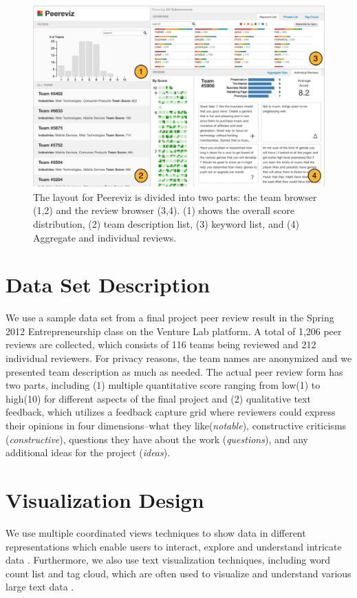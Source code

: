 \documentclass{sigchi}
\begin{document}
\begin{figure}[ht]
\centering
\includegraphics[width=2.0\columnwidth]{images/overview-annotated}
\caption{The layout for Peereviz is divided into two parts:
the team browser (1,2) and the review browser (3,4).
(1) shows the overall score distribution,
(2) team description list,
(3) keyword list, and
(4) Aggregate and individual reviews.}
\label{fig:overview-annotated}
\end{figure}

\section{Data Set Description}
We use a sample data set from a final project peer review result in the Spring
2012 Entrepreneurship class on the Venture Lab platform. A total of 1,206 peer
reviews are collected, which consists of 116 teams being reviewed and 212
individual reviewers. For privacy reasons, the team names are anonymized and we
presented team description as much as needed. The actual peer review form has
two parts, including (1) multiple quantitative score ranging from low(1) to
high(10) for different aspects of the final project and (2) qualitative text
feedback, which utilizes a feedback capture grid \cite{dbootcamp} where
reviewers could express their opinions in four dimensions–what they
like(\emph{notable}), constructive criticisms (\emph{constructive}), questions
they have about the work (\emph{questions}), and any additional ideas for the
project (\emph{ideas}).



\section{Visualization Design}
We use multiple coordinated views techniques to
show data in different representations which enable users to interact, explore
and understand intricate data \cite{roberts2007state}. Furthermore, we also
use text visualization techniques, including word count list and tag cloud,
which are often used to visualize and understand various large text data
\cite{kuo2007tag, wordcountwww}.
\end{document}
